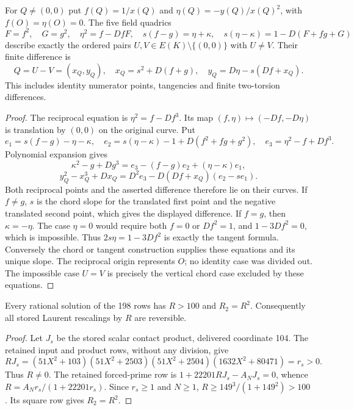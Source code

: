 \begin{lemma}\label{q198:reciprocal-pairs}
For $Q\ne(0,0)$ put $f(Q)=1/x(Q)$ and
$\eta(Q)=-y(Q)/x(Q)^2$, with $f(O)=\eta(O)=0$.
The five field quadrics
\[
 F=f^2,\quad G=g^2,\quad \eta^2=f-DfF,\quad
 s(f-g)=\eta+\kappa,\quad
 s(\eta-\kappa)=1-D(F+fg+G)
\]
describe exactly the ordered pairs $U,V\in E(K)\setminus\{(0,0)\}$
with $U\ne V$. Their finite difference is
\[
 Q=U-V=(x_Q,y_Q),\quad
 x_Q=s^2+D(f+g),\quad y_Q=D\eta-s(Df+x_Q).
\]
This includes identity numerator points, tangencies and finite
two-torsion differences.
\end{lemma}
\begin{proof}
The reciprocal equation is $\eta^2=f-Df^3$. Its map
$(f,\eta)\mapsto(-Df,-D\eta)$ is translation by $(0,0)$ on the
original curve. Put
\[
 e_1=s(f-g)-\eta-\kappa,\quad
 e_2=s(\eta-\kappa)-1+D(f^2+fg+g^2),\quad
 e_3=\eta^2-f+Df^3.
\]
Polynomial expansion gives
\[
 \kappa^2-g+Dg^3=e_3-(f-g)e_2+(\eta-\kappa)e_1,
\]
\[
 y_Q^2-x_Q^3+Dx_Q
 =D^2e_3-D(Df+x_Q)(e_2-se_1).
\]
Both reciprocal points and the asserted difference therefore lie on
their curves. If $f\ne g$, $s$ is the chord slope for the translated
first point and the negative translated second point, which gives
the displayed difference. If $f=g$, then $\kappa=-\eta$.
The case $\eta=0$ would require both $f=0$ or $Df^2=1$, and
$1-3Df^2=0$, which is impossible. Thus
$2s\eta=1-3Df^2$ is exactly the tangent formula. Conversely the
chord or tangent construction supplies these equations and its
unique slope. The reciprocal origin represents $O$; no identity
case was divided out. The impossible case $U=V$ is precisely the
vertical chord case excluded by these equations.
\end{proof}

\begin{lemma}\label{q198:nonzero-scale}
Every rational solution of the 198 rows has $R>100$ and $R_2=R^2$.
Consequently all stored Laurent rescalings by $R$ are reversible.
\end{lemma}
\begin{proof}
Let $J_s$ be the stored scalar contact product, delivered coordinate
104. The retained input and product rows, without any division, give
\[
 RJ_s=(51X^2+103)(51X^2+2503)(51X^2+2504)
                   (1632X^2+80471)=r_s>0.
\]
Thus $R\ne0$. The retained forced-prime row is
$1+22201RJ_s-A_NJ_s=0$, whence
$R=A_Nr_s/(1+22201r_s)$. Since $r_s\ge1$ and $N\ge1$,
$R\ge149^3/(1+149^2)>100$. Its square row gives $R_2=R^2$.
\end{proof}

